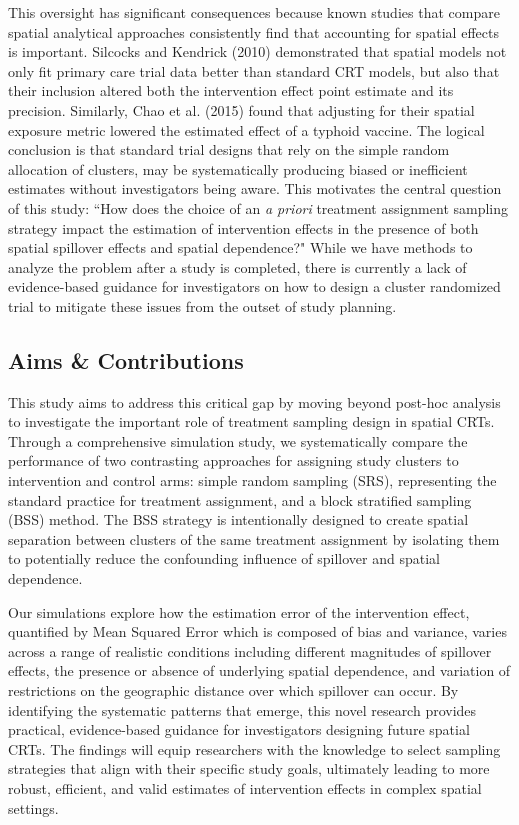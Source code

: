\documentclass{article}[11pt]
\begin{document}
This oversight has significant consequences because known studies that compare spatial analytical approaches consistently find that accounting for spatial effects is important. Silcocks and Kendrick (2010) demonstrated that spatial models not only fit primary care trial data better than standard CRT models, but also that their inclusion altered both the intervention effect point estimate and its precision\cite{silcocks_spatial_2010}. Similarly, Chao et al. (2015) found that adjusting for their spatial exposure metric lowered the estimated effect of a typhoid vaccine\cite{chao_contribution_2015}. The logical conclusion is that standard trial designs that rely on the simple random allocation of clusters, may be systematically producing biased or inefficient estimates without investigators being aware. This motivates the central question of this study: ``How does the choice of an \textit{a priori} treatment assignment sampling strategy impact the estimation of intervention effects in the presence of both spatial spillover effects and spatial dependence?" While we have methods to analyze the problem after a study is completed, there is currently a lack of evidence-based guidance for investigators on how to design a cluster randomized trial to mitigate these issues from the outset of study planning.

\subsection{Aims \& Contributions}

This study aims to address this critical gap by moving beyond post-hoc analysis to investigate the important role of treatment sampling design in spatial CRTs. Through a comprehensive simulation study, we systematically compare the performance of two contrasting approaches for assigning study clusters to intervention and control arms: simple random sampling (SRS), representing the standard practice for treatment assignment, and a block stratified sampling (BSS) method. The BSS strategy is intentionally designed to create spatial separation between clusters of the same treatment assignment by isolating them to potentially reduce the confounding influence of spillover and spatial dependence.

Our simulations explore how the estimation error of the intervention effect, quantified by Mean Squared Error which is composed of bias and variance, varies across a range of realistic conditions including different magnitudes of spillover effects, the presence or absence of underlying spatial dependence, and variation of restrictions on the geographic distance over which spillover can occur. By identifying the systematic patterns that emerge, this novel research provides practical, evidence-based guidance for investigators designing future spatial CRTs. The findings will equip researchers with the knowledge to select sampling strategies that align with their specific study goals, ultimately leading to more robust, efficient, and valid estimates of intervention effects in complex spatial settings.
\end{document}
